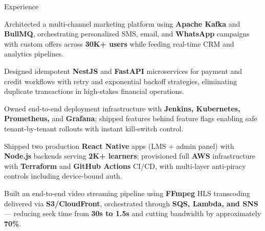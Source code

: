 \documentclass{resume}
\begin{document}
\begin{rSection}{Experience}
\begin{jobitems}
    \item Architected a multi-channel marketing platform using \textbf{Apache Kafka} and \textbf{BullMQ}, orchestrating personalized SMS, email, and \textbf{WhatsApp} campaigns with custom offers across \textbf{30K+ users} while feeding real-time CRM and analytics pipelines.
    \item Designed idempotent \textbf{NestJS} and \textbf{FastAPI} microservices for payment and credit workflows with retry and exponential backoff strategies, eliminating duplicate transactions in high-stakes financial operations.
    \item Owned end-to-end deployment infrastructure with \textbf{Jenkins, Kubernetes, Prometheus,} and \textbf{Grafana}; shipped features behind feature flags enabling safe tenant-by-tenant rollouts with instant kill-switch control.
\end{jobitems}

\begin{jobitems}
    \item Shipped two production \textbf{React Native} apps (LMS + admin panel) with \textbf{Node.js} backends serving \textbf{2K+ learners}; provisioned full \textbf{AWS} infrastructure with \textbf{Terraform} and \textbf{GitHub Actions} CI/CD, with multi-layer anti-piracy controls including device-bound auth.
    \item Built an end-to-end video streaming pipeline using \textbf{FFmpeg} HLS transcoding delivered via \textbf{S3/CloudFront}, orchestrated through \textbf{SQS, Lambda, and SNS} --- reducing seek time from \textbf{30s to 1.5s} and cutting bandwidth by approximately \textbf{70\%}.
\end{jobitems}

\end{rSection}\vspace{-0.7em}
\end{document}
